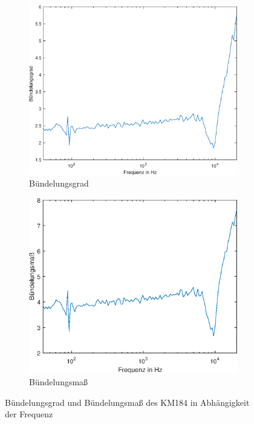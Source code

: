 \begin{figure}[bth]
    \centering
    \begin{subfigure}{.95\textwidth}
        \centering
        \includegraphics[width=0.8\linewidth]{Figures/Buendelungsgrad}
        \caption{Bündelungsgrad}
        \label{fig:buendelg}
    \end{subfigure}
    \begin{subfigure}{.95\textwidth}
        \centering
        \includegraphics[width=0.8\linewidth]{Figures/Buendelungsmass}
        \caption{Bündelungsmaß}
        \label{fig:buendelm}
    \end{subfigure}
    \caption{Bündelungsgrad und Bündelungsmaß des KM184 in Abhängigkeit der Frequenz}
    \label{fig:buendel}
\end{figure}
